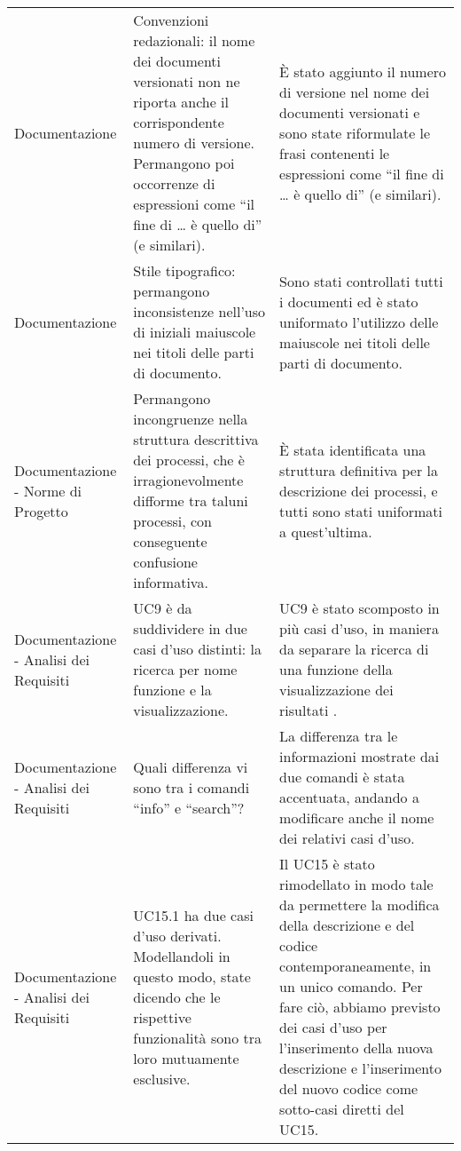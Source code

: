 \begin{longtable}{ 
				>{\centering}p{} 
				>{\centering}p{}
				>{\centering\arraybackslash}p{}}
				Documentazione
					&
				Convenzioni redazionali: il nome dei documenti versionati non ne riporta anche il corrispondente numero di versione. Permangono poi occorrenze di espressioni come “il fine di … è quello di” (e similari). 
					&
				È stato aggiunto il numero di versione nel nome dei documenti versionati e sono state riformulate le frasi contenenti le  espressioni come “il fine di … è quello di” (e similari).
					\\
					
				Documentazione
					&
				Stile tipografico: permangono inconsistenze nell’uso di iniziali maiuscole nei titoli delle parti di documento. 
					&
				Sono stati controllati tutti i documenti ed è stato uniformato l'utilizzo delle maiuscole nei titoli delle parti di documento.
					\\
					
				Documentazione - Norme di Progetto
					&
				Permangono incongruenze nella struttura descrittiva dei processi, che è irragionevolmente difforme tra taluni processi, con conseguente confusione informativa.
					&
				È stata identificata una struttura definitiva per la descrizione dei processi, e tutti sono stati uniformati a quest’ultima.
					\\
					
				Documentazione - Analisi dei Requisiti
					&
				UC9 è da suddividere in due casi d’uso distinti: la ricerca per nome funzione e la visualizzazione. 
					&
				UC9 è stato scomposto in più casi d’uso\ped{\textit{G}}, in maniera da separare la ricerca di una funzione della visualizzazione dei risultati  .
					\\
					
				Documentazione - Analisi dei Requisiti
					&
				Quali differenza vi sono tra i comandi “info” e “search”? 
					&
				La differenza tra le informazioni mostrate dai due comandi è stata accentuata, andando a modificare anche il nome dei relativi casi d’uso\ped{\textit{G}}.
					\\
					
				Documentazione - Analisi dei Requisiti
					&
				UC15.1 ha due casi d’uso\ped{\textit{G}} derivati. Modellandoli in questo modo, state dicendo che le rispettive funzionalità sono tra loro mutuamente esclusive. 
					&
				Il UC15 è stato rimodellato in modo tale da permettere la modifica della descrizione e del codice contemporaneamente, in un unico comando. Per fare ciò, abbiamo previsto dei casi d’uso\ped{\textit{G}} per l’inserimento della nuova descrizione e l’inserimento del nuovo codice come sotto-casi diretti del UC15.
					\\
					

\end{longtable}
